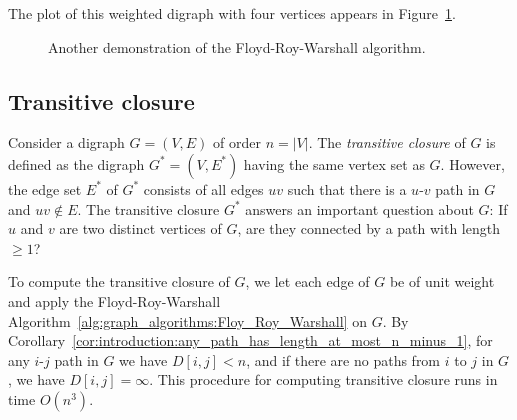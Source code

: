 The plot of this weighted digraph with four vertices appears in
Figure~\ref{fig:graph_algorithms:another_Floyd_Roy_Warshall_demo}.

\begin{figure}[!htbp]
\centering
{}
\caption{Another demonstration of the Floyd-Roy-Warshall algorithm.}
\label{fig:graph_algorithms:another_Floyd_Roy_Warshall_demo}
\end{figure}



\subsection{Transitive closure}

Consider a digraph $G = (V, E)$ of order $n = |V|$. The
\emph{transitive closure} of $G$ is defined
as the digraph $G^* = (V, E^*)$ having the same vertex set as
$G$. However, the edge set $E^*$ of $G^*$ consists of all edges $uv$
such that there is a $u$-$v$ path in $G$ and $uv \notin E$. The
transitive closure $G^*$ answers an important question about $G$: If
$u$ and $v$ are two distinct vertices of $G$, are they connected by a
path with length $\geq 1$?

To compute the transitive closure of $G$, we let each edge of $G$ be
of unit weight and apply the Floyd-Roy-Warshall
Algorithm~\ref{alg:graph_algorithms:Floy_Roy_Warshall} on $G$. By
Corollary~\ref{cor:introduction:any_path_has_length_at_most_n_minus_1},
for any $i$-$j$ path in $G$ we have $D[i,j] < n$, and if there are no
paths from $i$ to $j$ in $G$, we have $D[i,j] = \infty$. This
procedure for computing transitive closure runs in time $O(n^3)$.

